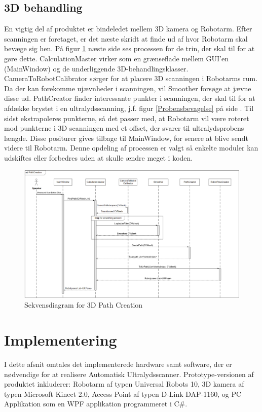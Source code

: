 \subsection{3D behandling}
En vigtig del af produktet er bindeledet mellem 3D kamera og Robotarm. Efter scanningen er foretaget, er det næste skridt at finde ud af hvor Robotarm skal bevæge sig hen. På figur \ref{seq_pathcreation} næste side ses processen for de trin, der skal til for at gøre dette. CalculationMaster virker som en grænseflade mellem GUI'en (MainWindow) og de underliggende 3D-behandlingsklasser. CameraToRobotCalibrator sørger for at placere 3D scanningen i Robotarms rum. Da der kan forekomme ujævnheder i scanningen, vil Smoother forsøge at jævne disse ud. PathCreator finder interessante punkter i scanningen, der skal til for at afdække brystet i en ultralydsscanning, j.f. figur \ref{Probensbevagelse} på side \pageref{Probensbevagelse}. Til sidst ekstrapoleres punkterne, så det passer med, at Robotarm vil være roteret mod punkterne i 3D scanningen med et offset, der svarer til ultralydsprobens længde. Disse positurer gives tilbage til MainWindow, for senere at blive sendt videre til Robotarm. Denne opdeling af processen er valgt så enkelte moduler kan udskiftes eller forbedres uden at skulle ændre meget i koden.

\newpage

\begin{figure}[H]
    \centering
    \includegraphics[width=1\textwidth, angle = 90]{figurer/d/Design/Sequence/sd_pathcreation}
    \caption{Sekvensdiagram for 3D Path Creation}
    \label{seq_pathcreation}
\end{figure}

\newpage

\section{Implementering}
I dette afsnit omtales det implementerede hardware samt software, der er nødvendige for at realisere Automatisk Ultralydsscanner.
Prototype-versionen af produktet inkluderer: Robotarm af typen Universal Robots 10, 3D kamera af typen Microsoft Kinect 2.0, Access Point af typen D-Link DAP-1160, og PC Applikation som en WPF applikation programmeret i C\#.
